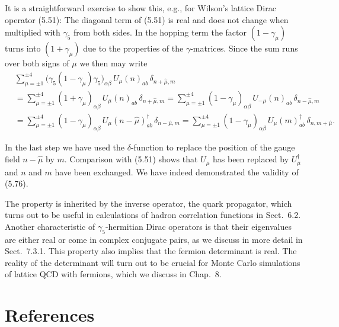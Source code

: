 It is a straightforward exercise to show this, e.g., for Wilson's lattice Dirac
operator (5.51): The diagonal term of (5.51) is real and does not change when
multiplied with $\gamma_5$ from both sides. In the hopping term the factor $(1-\gamma_\mu)$
turns into $(1+\gamma_\mu)$ due to the properties of the $\gamma$-matrices. Since the sum runs
over both signs of $\mu$ we then may write
\begin{equation}
  \begin{aligned}
    &\sum_{\mu=\pm1}^{\pm4}\big(\gamma_5(1-\gamma_\mu)\gamma_5\big)_{\alpha\beta}\,
      U_\mu(n)_{ab}\,\delta_{n+\hat{\mu},m}\\
    &= \sum_{\mu=\pm1}^{\pm4}(1+\gamma_\mu)_{\alpha\beta}\,
      U_\mu(n)_{ab}\,\delta_{n+\hat{\mu},m}
     = \sum_{\mu=\pm1}^{\pm4}(1-\gamma_\mu)_{\alpha\beta}\,
      U_{-\mu}(n)_{ab}\,\delta_{n-\hat{\mu},m}\\
    &= \sum_{\mu=\pm1}^{\pm4}(1-\gamma_\mu)_{\alpha\beta}\,
      U_\mu(n-\hat{\mu})^\dagger_{ab}\,\delta_{n-\hat{\mu},m}
     = \sum_{\mu=\pm1}^{\pm4}(1-\gamma_\mu)_{\alpha\beta}\,
      U_\mu(m)^\dagger_{ab}\,\delta_{n,m+\hat{\mu}} .
  \end{aligned}
\end{equation}

In the last step we have used the $\delta$-function to replace the position of the gauge
field $n-\hat{\mu}$ by $m$. Comparison with (5.51) shows that $U_\mu$ has been replaced
by $U_\mu^\dagger$ and $n$ and $m$ have been exchanged. We have indeed demonstrated the
validity of (5.76).

The property is inherited by the inverse operator, the quark propagator,
which turns out to be useful in calculations of hadron correlation functions
in Sect.~6.2. Another characteristic of $\gamma_5$-hermitian Dirac operators is that
their eigenvalues are either real or come in complex conjugate pairs, as we
discuss in more detail in Sect.~7.3.1. This property also implies that the fermion
determinant is real. The reality of the determinant will turn out to be crucial
for Monte Carlo simulations of lattice QCD with fermions, which we discuss
in Chap.~8.

\section*{References}


